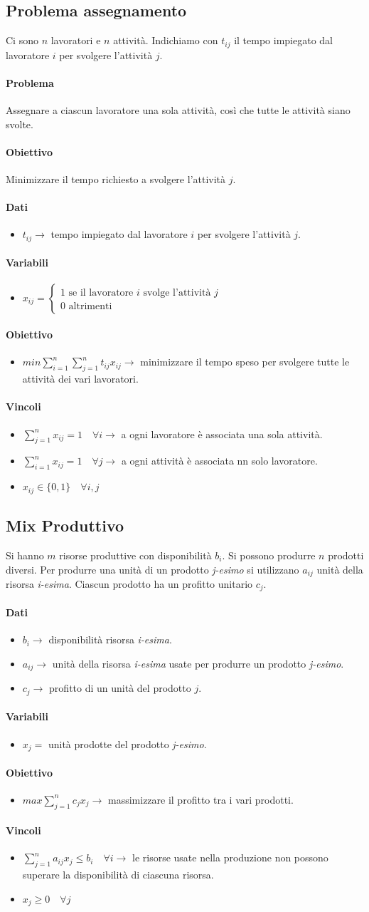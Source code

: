 \documentclass[12pt, twoside, letterpaper]{article}
\newcommand{\problemai}[5]{
	#1
	\begin{dati}
		\paragraph{Dati} 
			\begin{itemize}
				#2
			\end{itemize}
	\end{dati}
	\begin{variabili}
		\paragraph{Variabili} 
			\begin{itemize}
				#3
			\end{itemize}
	\end{variabili}
	\begin{obiettivo}
		\paragraph{Obiettivo} 
			\begin{itemize}
				#4
			\end{itemize}
	\end{obiettivo}
	\begin{vincoli}
		\paragraph{Vincoli}
			\begin{itemize}
				#5
			\end{itemize}
	\end{vincoli}
}
\begin{document}
		\subsection{Problema assegnamento}					
			\problemai
			{Ci sono $n$ lavoratori e $n$ attività. Indichiamo con $t_{ij}$ il tempo impiegato dal lavoratore $i$ per svolgere l'attività $j$.
			\paragraph{Problema} Assegnare a ciascun lavoratore una sola attività, così che tutte le attività siano svolte.
			\paragraph{Obiettivo} Minimizzare il tempo richiesto a svolgere l'attività $j$.}
			{\item $t_{ij} \rightarrow$ tempo impiegato dal lavoratore $i$ per svolgere l'attività $j$.}
			{\item $x_{ij} = \begin{cases} \text{1 se il lavoratore $i$ svolge l'attività $j$} \\ \text{0 altrimenti}\end{cases}$ }
			{\item $min \sum_{i=1}^n\sum_{j=1}^n t_{ij} x_{ij} \rightarrow$ minimizzare il tempo speso per svolgere tutte le attività dei vari lavoratori.}
			{\item $\sum_{j=1}^n x_{ij} = 1 \quad \forall i \rightarrow$ a ogni lavoratore è associata una sola attività.
			\item $\sum_{i=1}^n x_{ij} = 1 \quad \forall j \rightarrow$ a ogni attività è associata nn solo lavoratore.
			\item $x_{ij} \in \{0,1\} \quad \forall i,j$}

		
		\subsection{Mix Produttivo}
			\problemai
				{Si hanno $m$ risorse produttive con disponibilità $b_i$. Si possono produrre $n$ prodotti diversi. Per produrre una unità di un prodotto \textit{j-esimo} si utilizzano $a_{ij}$ unità della risorsa \textit{i-esima}. Ciascun prodotto ha un profitto unitario $c_j$.}
				{\item $b_i \rightarrow$ disponibilità risorsa \textit{i-esima}.
				\item $a_{ij} \rightarrow$ unità della risorsa \textit{i-esima} usate per produrre un prodotto \textit{j-esimo}.
				\item $c_j \rightarrow$ profitto di un unità del prodotto $j$. }
				{\item $x_j =$ unità prodotte del prodotto \textit{j-esimo}.}
				{\item $max \sum_{j=1}^n c_j x_j \rightarrow$ massimizzare il profitto tra i vari prodotti.}
				{\item $\sum_{j=1}^n a_{ij} x_j \leq b_i \quad \forall i \rightarrow$ le risorse usate nella produzione non possono superare la disponibilità di ciascuna risorsa.
				\item $x_j \geq 0 \quad \forall j$}
\end{document}
